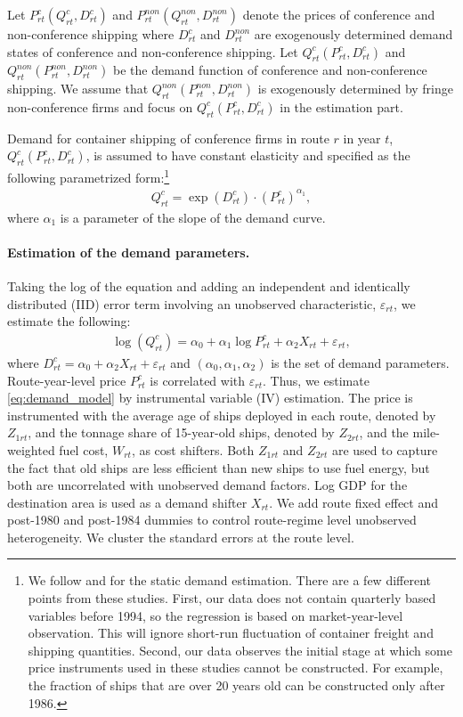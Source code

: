 \documentclass[10pt]{article}
\begin{document}
Let $P_{rt}^{c}(Q_{rt}^c,D_{rt}^{c})$ and $P_{rt}^{non}(Q_{rt}^{non},D_{rt}^{non})$ denote the prices of conference and non-conference shipping where $D_{rt}^{c}$ and $D_{rt}^{non}$ are exogenously determined demand states of conference and non-conference shipping. Let $Q_{rt}^{c}(P_{rt}^{c},D_{rt}^{c})$ and $Q_{rt}^{non}(P_{rt}^{non},D_{rt}^{non})$ be the demand function of conference and non-conference shipping. We assume that $Q_{rt}^{non}(P_{rt}^{non},D_{rt}^{non})$ is exogenously determined by fringe non-conference firms and focus on $Q_{rt}^{c}(P_{rt}^{c},D_{rt}^{c})$ in the estimation part.  

Demand for container shipping of conference firms in route $r$ in year $t$, $Q_{rt}^c(P_{rt}^c,D_{rt}^{c})$, is assumed to have constant elasticity and specified as the following parametrized form:\footnote{We follow \cite{kalouptsidi2014aer} and \cite{jeon2022learning} for the static demand estimation. There are a few different points from these studies. First, our data does not contain quarterly based variables before 1994, so the regression is based on market-year-level observation. This will ignore short-run fluctuation of container freight and shipping quantities. Second, our data observes the initial stage at which some price instruments used in these studies cannot be constructed. For example, the fraction of ships that are over 20 years old can be constructed only after 1986.}
\begin{align*}
    Q_{rt}^{c} = \exp(D_{rt}^{c})\cdot (P^{c}_{rt})^{\alpha_1},
\end{align*}
where $\alpha_1$ is a parameter of the slope of the demand curve.

\paragraph{Estimation of the demand parameters.}
Taking the log of the equation and adding an independent and identically distributed (IID) error term involving an unobserved characteristic, $\varepsilon_{rt}$, we estimate the following:
\begin{align}
    \log(Q_{rt}^c) = \alpha_0 + \alpha_1 \log P_{rt}^{c} + \alpha_2X_{rt} + \varepsilon_{rt}, \label{eq:demand_model}
\end{align}
where $D_{rt}^c=\alpha_0+ \alpha_2X_{rt} + \varepsilon_{rt}$ and $(\alpha_0,\alpha_1,\alpha_2)$ is the set of demand parameters.
Route-year-level price $P_{rt}^{c}$ is correlated with $\varepsilon_{rt}$. Thus, we estimate \eqref{eq:demand_model} by instrumental variable (IV) estimation. The price is instrumented with the average age of ships deployed in each route, denoted by $Z_{1rt}$, and the tonnage share of 15-year-old ships, denoted by $Z_{2rt}$, and the mile-weighted fuel cost, $W_{rt}$, as cost shifters. Both $Z_{1rt}$ and $Z_{2rt}$ are used to capture the fact that old ships are less efficient than new ships to use fuel energy, but both are uncorrelated with unobserved demand factors. Log GDP for the destination area is used as a demand shifter $X_{rt}$. We add route fixed effect and post-1980 and post-1984 dummies to control route-regime level unobserved heterogeneity. We cluster the standard errors at the route level. 
\end{document}

